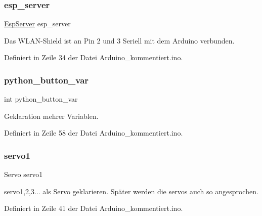 \subsubsection{\texorpdfstring{esp\+\_\+server}{esp\_server}}
{\footnotesize\ttfamily \hyperlink{class_esp_server}{Esp\+Server} esp\+\_\+server}



Das W\+L\+A\+N-\/\+Shield ist an Pin 2 und 3 Seriell mit dem Arduino verbunden. 



Definiert in Zeile 34 der Datei Arduino\+\_\+kommentiert.\+ino.

\mbox{\label{_arduino__kommentiert_8ino_a409d566aad8f36a68f5c2ec46ce59393}} 
\subsubsection{\texorpdfstring{python\+\_\+button\+\_\+var}{python\_button\_var}}
{\footnotesize\ttfamily int python\+\_\+button\+\_\+var}



Geklaration mehrer Variablen. 



Definiert in Zeile 58 der Datei Arduino\+\_\+kommentiert.\+ino.

\mbox{\label{_arduino__kommentiert_8ino_ac5d2bea44c6318454db0e2639a4efe95}} 
\subsubsection{\texorpdfstring{servo1}{servo1}}
{\footnotesize\ttfamily Servo servo1}



servo1,2,3... als Servo geklarieren. Später werden die servos auch so angesprochen. 



Definiert in Zeile 41 der Datei Arduino\+\_\+kommentiert.\+ino.

\mbox{\label{_arduino__kommentiert_8ino_a6458146b8e54c3729bbee8c037921c72}} 
